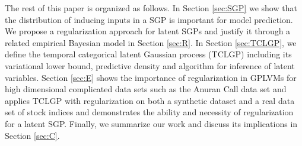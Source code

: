 \documentclass{article}
\begin{document}
The rest of this paper is organized as follows. In Section \ref{sec:SGP} we show that the distribution of inducing inputs in a SGP is important for model prediction. We propose a regularization approach for latent SGPs and justify it through a related empirical Bayesian model in Section \ref{sec:R}. In Section \ref{sec:TCLGP}, we define the temporal categorical latent Gaussian process (TCLGP) including its variational lower bound, predictive density and algorithm for inference of latent variables. Section \ref{sec:E} shows the importance of regularization in GPLVMs for high dimensional complicated data sets such as the Anuran Call data set and applies TCLGP with regularization on both a synthetic dataset and a real data set of stock indices and demonstrates the ability and necessity of regularization for a latent SGP. Finally, we summarize our work and discuss its implications in Section \ref{sec:C}.
\end{document}
